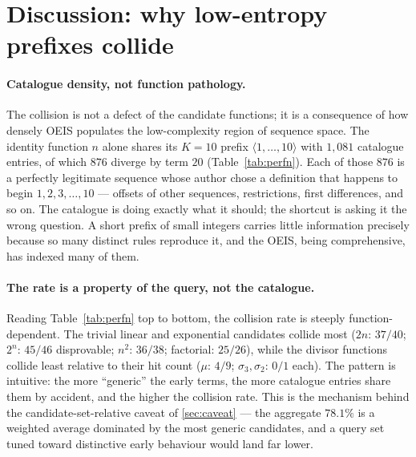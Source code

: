 \documentclass[11pt,a4paper]{article}
\newcommand{\sig}{\sigma}
\newcommand{\Kten}{K\!=\!10}
\theoremstyle{definition}
\begin{document}
\section{Discussion: why low-entropy prefixes collide}
\label{sec:discussion}

\paragraph{Catalogue density, not function pathology.} The collision is not a
defect of the candidate functions; it is a consequence of how densely OEIS
populates the low-complexity region of sequence space. The identity function
$n$ alone shares its $\Kten$ prefix $\langle 1,\dots,10\rangle$ with $1{,}081$
catalogue entries, of which $876$ diverge by term $20$
(Table~\ref{tab:perfn}). Each of those $876$ is a perfectly legitimate
sequence whose author chose a definition that happens to begin
$1,2,3,\dots,10$ --- offsets of other sequences, restrictions, first
differences, and so on. The catalogue is doing exactly what it should; the
shortcut is asking it the wrong question. A short prefix of small integers
carries little information precisely because so many distinct rules reproduce
it, and the OEIS, being comprehensive, has indexed many of them.

\paragraph{The rate is a property of the query, not the catalogue.} Reading
Table~\ref{tab:perfn} top to bottom, the collision rate is steeply
function-dependent. The trivial linear and exponential candidates collide most
($2n$: $37/40$; $2^n$: $45/46$ disprovable; $n^2$: $36/38$; factorial:
$25/26$), while the divisor functions collide least relative to their hit count
($\mu$: $4/9$; $\sig_3,\sig_2$: $0/1$ each). The pattern is intuitive: the more
``generic'' the early terms, the more catalogue entries share them by
accident, and the higher the collision rate. This is the mechanism behind the
candidate-set-relative caveat of \textsection\ref{sec:caveat} --- the
aggregate $78.1\%$ is a weighted average dominated by the most generic
candidates, and a query set tuned toward distinctive early behaviour would land
far lower.
\end{document}
